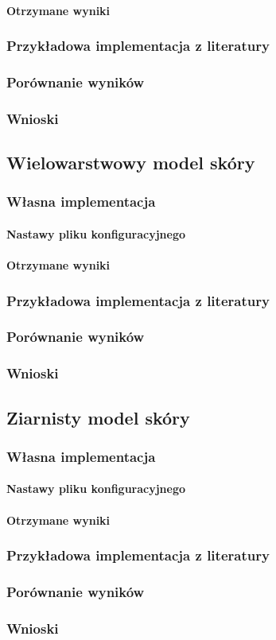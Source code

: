 \paragraph{Otrzymane wyniki}
\subsubsection{Przykładowa implementacja z literatury}
\subsubsection{Porównanie wyników}
\subsubsection{Wnioski}

\subsection{Wielowarstwowy model skóry}
\subsubsection{Własna implementacja}
\paragraph{Nastawy pliku konfiguracyjnego}
\paragraph{Otrzymane wyniki}
\subsubsection{Przykładowa implementacja z literatury}
\subsubsection{Porównanie wyników}
\subsubsection{Wnioski}

\subsection{Ziarnisty model skóry}
\subsubsection{Własna implementacja}
\paragraph{Nastawy pliku konfiguracyjnego}
\paragraph{Otrzymane wyniki}
\subsubsection{Przykładowa implementacja z literatury}
\subsubsection{Porównanie wyników}
\subsubsection{Wnioski}
